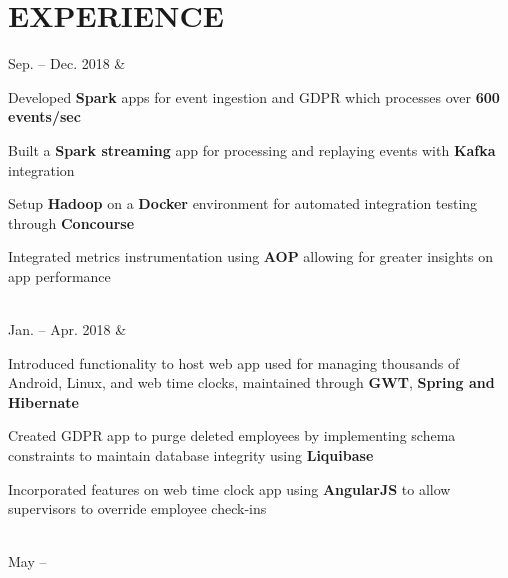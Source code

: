 \documentclass[]{richard-dang}
\begin{document}
\section*{\faGroup \hspace{\FAspace} EXPERIENCE}
\begin{tabularcv}
    Sep. – \newline 
    Dec. 2018   &  
                    \href{https://www.ultimatesoftware.com}{
                    }
                    \begin{tabitemize}
                        \item Developed \textbf{Spark} apps for event ingestion and GDPR which processes over \textbf{600 events/sec}
                        \item Built a \textbf{Spark streaming} app for processing and replaying events with \textbf{Kafka} integration
                        \item Setup \textbf{Hadoop} on a \textbf{Docker} environment for automated integration testing through \textbf{Concourse}
                        \item Integrated metrics instrumentation using \textbf{AOP} allowing for greater insights on app performance 
                    \end{tabitemize} 
                    \\[\vspacepar] 
    Jan. – \newline 
    Apr. 2018   &  
                    \href{https://www.ultimatesoftware.com}{
                    }
                    \begin{tabitemize}
                        \item Introduced functionality to host web app used for managing thousands of Android, Linux, and web time clocks, maintained through \textbf{GWT}, \textbf{Spring and Hibernate}
                        \item Created GDPR app to purge deleted employees by implementing schema constraints to maintain database integrity using \textbf{Liquibase}
                        \item Incorporated features on web time clock app using \textbf{AngularJS} to allow supervisors to override employee check-ins
                    \end{tabitemize} 
                    \\[\vspacepar] 
    May – \newline 

\end{tabularcv}
\end{document}
